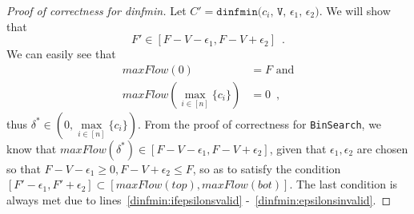 \begin{proof}[Proof of correctness for dinfmin]
  Let $C' = \texttt{dinfmin(}c_i\texttt{, V, } \epsilon_1\texttt{, } \epsilon_2\texttt{)}$. We will show that
  \begin{equation*}
    F' \in [F - V - \epsilon_1, F - V + \epsilon_2] \enspace.
  \end{equation*}
  We can easily see that
  \begin{align*}
    maxFlow\left(0\right) &= F \mbox{ and} \\
    maxFlow\left(\max\limits_{i \in [n]}\{c_i\}\right) &= 0 \enspace,
  \end{align*}
  thus $\delta^* \in \left(0, \max\limits_{i \in [n]}\{c_i\}\right)$. From the proof of correctness for \texttt{BinSearch},
  we know that $maxFlow\left(\delta^*\right) \in \left[F - V - \epsilon_1, F - V + \epsilon_2\right]$, given that
  $\epsilon_1, \epsilon_2$ are chosen so that $F - V - \epsilon_1 \geq 0, F - V + \epsilon_2 \leq F$, so as to satisfy the
  condition $\left[F' - \epsilon_1, F' + \epsilon_2\right] \subset \left[maxFlow\left(top\right),
  maxFlow\left(bot\right)\right]$. The last condition is always met due to lines~\ref{dinfmin:ifepsilonsvalid}
  -~\ref{dinfmin:epsilonsinvalid}.
\end{proof}
